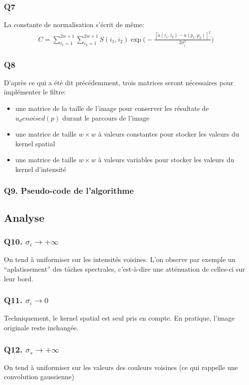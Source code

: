 \documentclass{article}
\begin{document}
\subsubsection*{Q7}
La constante de normalisation s'écrit de même:
\begin{equation*}\begin{split}
C = \displaystyle\sum_{i_1 = 1}^{2w + 1}
\displaystyle\sum_{i_2 = 1}^{2w + 1} S(i_1,i_2) \exp{ \big ( - \frac{[\tilde{u}(i_1, i_2) - u(p_1, p_2)]^2}{2\sigma_i^2} \big )}
\end{split}\end{equation*}
\subsubsection*{Q8}
D'après ce qui a été dit précédemment, trois matrices seront nécessaires pour implémenter le filtre:
\begin{itemize}
\item une matrice de la taille de l'image pour conserver les résultats de $u_denoised(p)$ durant le parcours de l'image
\item une matrice de taille $w \times w$ à valeurs constantes pour stocker les valeurs du kernel spatial
\item une matrice de taille $w \times w$ à valeurs variables pour stocker les valeurs du kernel d'intensité
\end{itemize}
\subsubsection*{Q9. Pseudo-code de l'algorithme}
\subsection{Analyse}
\subsubsection*{Q10. $\sigma_i \rightarrow + \infty $}
On tend à uniformiser sur les intensités voisines. L'on observe par exemple un ``aplatissement'' des tâches spectrales, c'est-à-dire une atténuation de celles-ci sur leur bord.
\subsubsection*{Q11. $\sigma_i \rightarrow 0 $}
Techniquement, le kernel spatial est seul pris en compte. En pratique, l'image originale reste inchangée.
\subsubsection*{Q12. $\sigma_s \rightarrow + \infty $}
On tend à uniformiser sur les valeurs des couleurs voisines (ce qui rappelle une convolution gaussienne)
\end{document}
